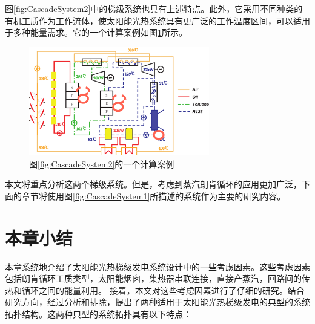 图\ref{fig:CascadeSystem2}中的梯级系统也具有上述特点。此外，它采用不同种类的有机工质作为工作流体，使太阳能光热系统具有更广泛的工作温度区间，可以适用于多种能量需求。它的一个计算案例如图\ref{fig:Ex_CascadeSystem2}所示。
\begin{figure}[htbp]
\centering 
\includegraphics[width=0.7\textwidth]{fig/Ex_CascadeSystem2}
\caption{图\ref{fig:CascadeSystem2}的一个计算案例}
\label{fig:Ex_CascadeSystem2}
\end{figure}
本文将重点分析这两个梯级系统。但是，考虑到蒸汽朗肯循环的应用更加广泛，下面的章节将使用图\ref{fig:CascadeSystem1}所描述的系统作为主要的研究内容。

\newpage
\section{本章小结}
本章系统地介绍了太阳能光热梯级发电系统设计中的一些考虑因素。这些考虑因素包括朗肯循环工质类型，太阳能烟囱，集热器串联连接，直接产蒸汽，回路间的传热和循环之间的能量利用。
接着，本文对这些考虑因素进行了仔细的研究。结合研究方向，经过分析和排除，提出了两种适用于太阳能光热梯级发电的典型的系统拓扑结构。这两种典型的系统拓扑具有以下特点：

